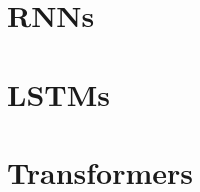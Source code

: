 \documentclass[10pt]{report}
\begin{document}
\section{RNNs}
\section{LSTMs}
\section{Transformers}
\end{document}
